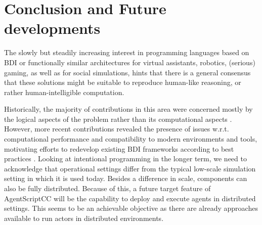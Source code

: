 \section{Conclusion and Future developments}

The slowly but steadily increasing interest in programming languages based on BDI or functionally similar architectures for virtual assistants, robotics, (serious) gaming, as well as for social simulations, hints that there is a general consensus that these solutions might be suitable to reproduce human-like reasoning, or rather human-intelligible computation. 

Historically, the majority of contributions in this area were concerned mostly by the logical aspects of the problem rather than its computational aspects \cite{Herzig2017}. However, more recent contributions %
revealed the presence of issues w.r.t. computational performance and compatibility to modern environments and tools, motivating efforts to redevelop existing BDI frameworks according to best practices \cite{LJ,pyson}. Looking at intentional programming in the longer term, we need to acknowledge that operational settings differ from the typical low-scale simulation setting in which it is used today. Besides a difference in scale, components can also be fully distributed. %
Because of this, a future target feature of AgentScriptCC will be the capability to deploy and execute agents in distributed settings. This seems to be an achievable objective as there are already approaches available to run actors in distributed environments.%

